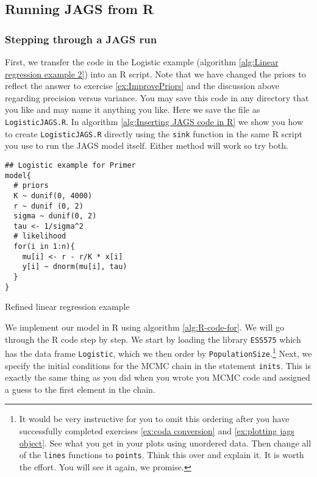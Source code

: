\documentclass[12pt,english]{article}
\begin{document}
\subsection{Running JAGS from R}

\subsubsection{Stepping through a JAGS run} \label{sssec:Stepping through a JAGS run}

First, we transfer the code in the Logistic example (algorithm \ref{alg:Linear regression example 2}) into an R script. Note that we have changed the priors to reflect the answer to exercise \ref{ex:ImprovePriors} and the discussion above regarding precision versus variance. You may save this code in any directory that you like and may name it anything you like. Here we save the file as \texttt{LogisticJAGS.R}. In algorithm \ref{alg:Inserting JAGS code in R} we show you how to create \texttt{LogisticJAGS.R} directly using the \texttt{sink} function in the same R script you use to run the JAGS model itself. Either method will work so try both.

\begin{algorithm}
\begin{Verbatim}[frame=single]
## Logistic example for Primer
model{
  # priors
  K ~ dunif(0, 4000)
  r ~ dunif (0, 2)
  sigma ~ dunif(0, 2) 
  tau <- 1/sigma^2
  # likelihood
  for(i in 1:n){
    mu[i] <- r - r/K * x[i]
    y[i] ~ dnorm(mu[i], tau)
  }
}
\end{Verbatim}
\caption{Refined linear regression example}
\label{alg:Linear regression example 2}
\end{algorithm}

We implement our model in R using algorithm \ref{alg:R-code-for}. We will go through the R code step by step. We start by loading the library \texttt{ESS575} which has the data frame \texttt{Logistic}, which we then order by \texttt{PopulationSize}.\footnote{It would be very instructive for you to omit this ordering after you have successfully completed exercises \ref{ex:coda conversion} and \ref{ex:plotting jags object}. See what you get in your plots using unordered data. Then change all of the \texttt{lines} functions to \texttt{points}. Think this over and explain it. It is worth the effort. You will see it again, we promise.} Next, we specify the initial conditions for the MCMC chain in the statement \texttt{inits}. This is exactly the same thing as you did when you wrote you MCMC code and assigned a guess to the first element in the chain. 
\end{document}
